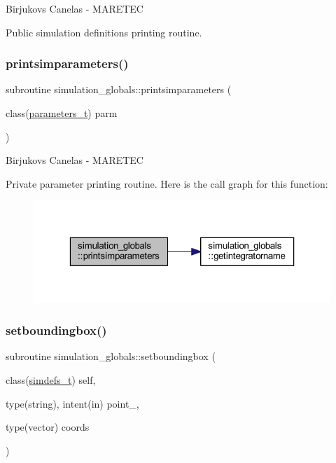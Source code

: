 Birjukovs Canelas -\/ M\+A\+R\+E\+T\+EC 

Public simulation definitions printing routine. \mbox{\label{namespacesimulation__globals_aab481887940af0d76b2d7aa844382faa}} 
\subsubsection{\texorpdfstring{printsimparameters()}{printsimparameters()}}
{\footnotesize\ttfamily subroutine simulation\+\_\+globals\+::printsimparameters (\begin{DoxyParamCaption}\item[{class(\mbox{\hyperlink{structsimulation__globals_1_1parameters__t}{parameters\+\_\+t}})}]{parm }\end{DoxyParamCaption})\hspace{0.3cm}{\ttfamily [private]}}



Birjukovs Canelas -\/ M\+A\+R\+E\+T\+EC 

Private parameter printing routine. Here is the call graph for this function\+:
\nopagebreak
\begin{figure}[H]
\begin{center}
\leavevmode
\includegraphics[width=323pt]{namespacesimulation__globals_aab481887940af0d76b2d7aa844382faa_cgraph}
\end{center}
\end{figure}
\mbox{\label{namespacesimulation__globals_a1fc4653684d73efecdbd140b6cafe541}} 
\subsubsection{\texorpdfstring{setboundingbox()}{setboundingbox()}}
{\footnotesize\ttfamily subroutine simulation\+\_\+globals\+::setboundingbox (\begin{DoxyParamCaption}\item[{class(\mbox{\hyperlink{structsimulation__globals_1_1simdefs__t}{simdefs\+\_\+t}})}]{self,  }\item[{type(string), intent(in)}]{point\+\_\+,  }\item[{type(vector)}]{coords }\end{DoxyParamCaption})\hspace{0.3cm}{\ttfamily [private]}}



